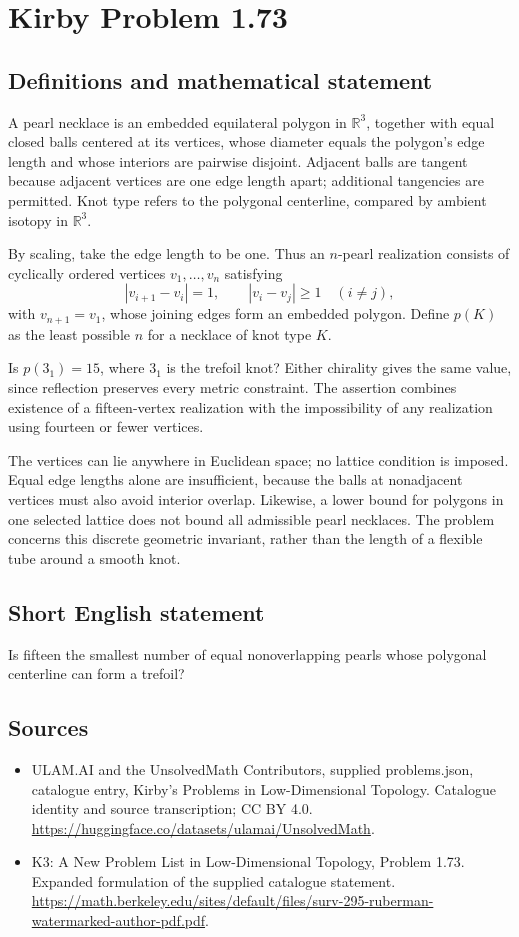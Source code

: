 \documentclass[11pt,a4paper]{article}
\begin{document}
\section*{Kirby Problem 1.73}\label{statement}

\subsection{Definitions and mathematical statement}
A pearl necklace is an embedded equilateral polygon in $\mathbb R^3$, together with equal closed balls centered at its vertices, whose diameter equals the polygon's edge length and whose interiors are pairwise disjoint. Adjacent balls are tangent because adjacent vertices are one edge length apart; additional tangencies are permitted. Knot type refers to the polygonal centerline, compared by ambient isotopy in $\mathbb R^3$.

By scaling, take the edge length to be one. Thus an $n$-pearl realization consists of cyclically ordered vertices $v_1,\ldots,v_n$ satisfying
\[
|v_{i+1}-v_i|=1,\qquad |v_i-v_j|\ge1\quad(i\ne j),
\]
with $v_{n+1}=v_1$, whose joining edges form an embedded polygon. Define $p(K)$ as the least possible $n$ for a necklace of knot type $K$.

Is $p(3_1)=15$, where $3_1$ is the trefoil knot? Either chirality gives the same value, since reflection preserves every metric constraint. The assertion combines existence of a fifteen-vertex realization with the impossibility of any realization using fourteen or fewer vertices.

The vertices can lie anywhere in Euclidean space; no lattice condition is imposed. Equal edge lengths alone are insufficient, because the balls at nonadjacent vertices must also avoid interior overlap. Likewise, a lower bound for polygons in one selected lattice does not bound all admissible pearl necklaces. The problem concerns this discrete geometric invariant, rather than the length of a flexible tube around a smooth knot.
\subsection{Short English statement}
Is fifteen the smallest number of equal nonoverlapping pearls whose polygonal centerline can form a trefoil?
\subsection{Sources}
\begin{itemize}
\item[S1] ULAM.AI and the UnsolvedMath Contributors, supplied problems.json, catalogue entry, Kirby's Problems in Low-Dimensional Topology. Catalogue identity and source transcription; CC BY 4.0.
\url{https://huggingface.co/datasets/ulamai/UnsolvedMath}.
\item[S2] K3: A New Problem List in Low-Dimensional Topology, Problem 1.73. Expanded formulation of the supplied catalogue statement.
\url{https://math.berkeley.edu/sites/default/files/surv-295-ruberman-watermarked-author-pdf.pdf}.
\end{itemize}
\end{document}
